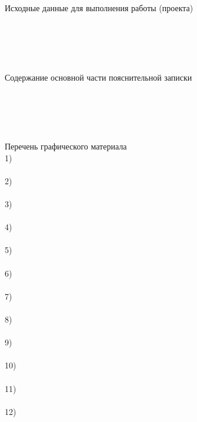\begin{titlepage}
\begin{flushleft}
\vspace{.3cm}
Исходные данные для выполнения работы (проекта)\\
\hrulefill\\
\hrulefill\\
\hrulefill\\
\hrulefill\\
\hrulefill\\
Содержание основной части пояснительной записки\\
\hrulefill\\
\hrulefill\\
\hrulefill\\
\hrulefill\\
\hrulefill\\

Перечень графического материала\\
1) \hrulefill\\
\hrulefill\\
2) \hrulefill\\
\hrulefill\\
3) \hrulefill\\
\hrulefill\\
4) \hrulefill\\
\hrulefill\\
5) \hrulefill\\
\hrulefill\\
6) \hrulefill\\
\hrulefill\\
7) \hrulefill\\
\hrulefill\\
8) \hrulefill\\
\hrulefill\\
9) \hrulefill\\
\hrulefill\\
10) \hrulefill\\
\hrulefill\\
11) \hrulefill\\
\hrulefill\\
12) \hrulefill\\
\hrulefill\\


\end{flushleft}
\end{titlepage}
